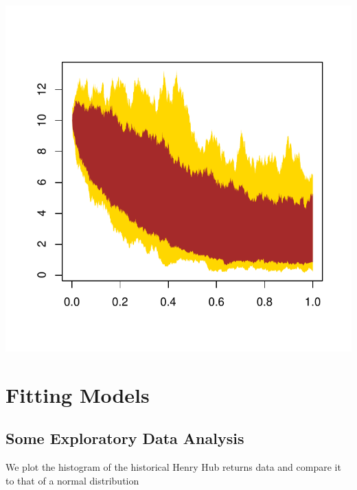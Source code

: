 \documentclass[10pt]{article}\usepackage[]{graphicx}\usepackage[]{color}
\makeatletter
\def\maxwidth{ %
  \ifdim\Gin@nat@width>\linewidth
    \linewidth
  \else
    \Gin@nat@width
  \fi
}
\newenvironment{knitrout}{}{} %
\makeatother
\begin{document}
\begin{knitrout}
{\centering \includegraphics[width=\maxwidth]{figure/unnamed-chunk-3} 

}



\end{knitrout}


\section{Fitting Models} 

\subsection{Some Exploratory Data Analysis}

We plot the histogram of the historical Henry Hub returns data and compare it to that of a normal distribution  
\end{document}
